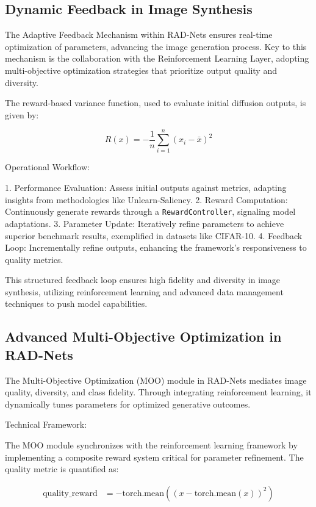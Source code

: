 \documentclass{article} %
\begin{document}
\subsection{Dynamic Feedback in Image Synthesis}
The Adaptive Feedback Mechanism within RAD-Nets ensures real-time optimization of parameters, advancing the image generation process. Key to this mechanism is the collaboration with the Reinforcement Learning Layer, adopting multi-objective optimization strategies that prioritize output quality and diversity.

The reward-based variance function, used to evaluate initial diffusion outputs, is given by:

\[
R(x) = -\frac{1}{n}\sum_{i=1}^{n}(x_i - \bar{x})^2
\]

Operational Workflow:

1. Performance Evaluation: Assess initial outputs against metrics, adapting insights from methodologies like Unlearn-Saliency.
2. Reward Computation: Continuously generate rewards through a \texttt{RewardController}, signaling model adaptations.
3. Parameter Update: Iteratively refine parameters to achieve superior benchmark results, exemplified in datasets like CIFAR-10.
4. Feedback Loop: Incrementally refine outputs, enhancing the framework's responsiveness to quality metrics.

This structured feedback loop ensures high fidelity and diversity in image synthesis, utilizing reinforcement learning and advanced data management techniques to push model capabilities.

\subsection{Advanced Multi-Objective Optimization in RAD-Nets}
The Multi-Objective Optimization (MOO) module in RAD-Nets mediates image quality, diversity, and class fidelity. Through integrating reinforcement learning, it dynamically tunes parameters for optimized generative outcomes.

Technical Framework:

The MOO module synchronizes with the reinforcement learning framework by implementing a composite reward system critical for parameter refinement. The quality metric is quantified as:

\begin{align}
\text{quality\_reward} &= -\text{torch.mean}\left((x - \text{torch.mean}(x))^2\right)
\end{align}
\end{document}

